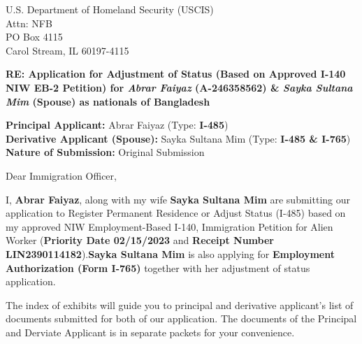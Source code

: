\documentclass{letter}
\date{July 01, 2024}
\newcommand{\Anum}{A-246358562}
\begin{document}
\begin{letter}{U.S. Department of Homeland Security (USCIS)\\
Attn: NFB\\
PO Box 4115\\
Carol Stream, IL 60197-4115

\vspace{0.5cm}

\textbf{RE: Application for Adjustment of Status (Based on Approved I-140 NIW EB-2 Petition)
for \textit{Abrar Faiyaz} (\Anum) \& \textit{Sayka Sultana Mim} (Spouse) as nationals of Bangladesh }
\vspace{0.5cm}

\textbf{Principal Applicant:} Abrar Faiyaz ({Type:} \textbf{I-485})\\
\textbf{Derivative Applicant (Spouse):} Sayka Sultana Mim  ({Type:} \textbf{I-485 \& I-765})\\
\textbf{Nature of Submission:} Original Submission \\

}






\opening{Dear Immigration Officer,}


I, \textbf{Abrar Faiyaz}, along with  my wife \textbf{Sayka Sultana Mim} are submitting our application to Register Permanent Residence or Adjust Status (I-485) based on my approved NIW Employment-Based I-140, Immigration Petition for Alien Worker (\textbf{Priority Date 02/15/2023} and \textbf{Receipt Number LIN2390114182}).\textbf{Sayka Sultana Mim} is also applying for \textbf{Employment Authorization (Form I-765)} together with her adjustment of status application.


The index of exhibits will guide you to principal and derivative applicant's list of documents submitted for both of our application. The documents of the Principal and Derviate Applicant is in separate packets for your convenience.



\end{letter}
\end{document}
